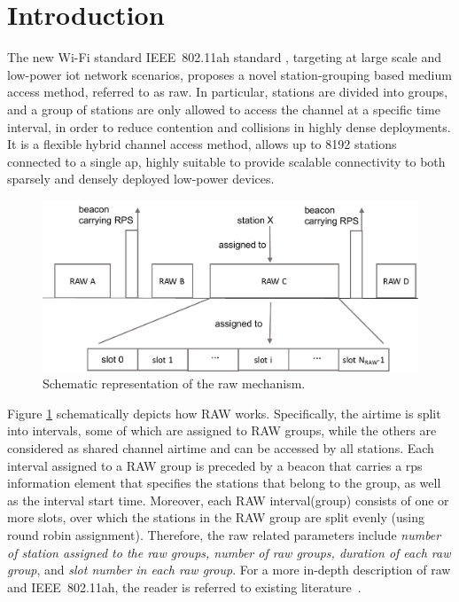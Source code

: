 \section{Introduction}

The new Wi-Fi standard IEEE~802.11ah standard \cite{80211ahStd}, targeting at large scale and low-power \gls{iot} network scenarios, proposes a novel station-grouping based medium access method, referred to as \gls{raw}. In particular, stations are divided into groups, and a group of stations are only allowed to access the channel at a specific time interval, in order to reduce contention and collisions in highly dense deployments. It is a flexible hybrid channel access method, allows up to 8192 stations connected to a single \gls{ap}, highly suitable to provide scalable connectivity to both sparsely and densely deployed low-power devices. 


\begin{figure}[t]
  \centering
  \includegraphics[width=0.8\columnwidth]{figures/raw}
  \caption{Schematic representation of the \gls{raw} mechanism.\label{fig:RAW}}
\end{figure}


Figure \ref{fig:RAW} schematically depicts how RAW works. Specifically, the airtime is split into intervals, some of which are assigned to RAW groups, while the others are considered as shared channel airtime and can be accessed by all stations. Each interval assigned to a RAW group is preceded by a beacon that carries a \gls{rps} information element that specifies the stations that belong to the group, as
well as the interval start time. Moreover, each RAW interval(group) consists of one or more slots, over which the stations in the RAW group are split evenly (using round robin assignment). Therefore, the \gls{raw} related parameters include
 \textit{ number of station assigned to the \gls{raw} groups, number of \gls{raw} groups, duration of each \gls{raw} group}, and  \textit{slot number in each \gls{raw} group}. For a more in-depth description of \gls{raw} and IEEE~802.11ah, the reader is referred to existing literature~\cite{80211ahStd, Khorov2015a, sensors80211ah}.

